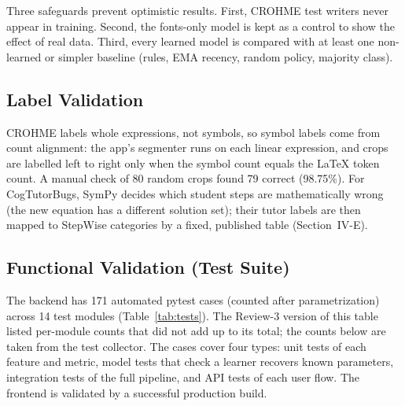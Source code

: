 \documentclass[conference]{IEEEtran}
\begin{document}
Three safeguards prevent optimistic results. First, CROHME test writers never appear in training. Second, the fonts-only model is kept as a control to show the effect of real data. Third, every learned model is compared with at least one non-learned or simpler baseline (rules, EMA recency, random policy, majority class).

\subsection{Label Validation}
CROHME labels whole expressions, not symbols, so symbol labels come from count alignment: the app's segmenter runs on each linear expression, and crops are labelled left to right only when the symbol count equals the LaTeX token count. A manual check of 80 random crops found 79 correct (98.75\%). For CogTutorBugs, SymPy decides which student steps are mathematically wrong (the new equation has a different solution set); their tutor labels are then mapped to StepWise categories by a fixed, published table (Section~IV-E).

\subsection{Functional Validation (Test Suite)}
The backend has 171 automated pytest cases (counted after parametrization) across 14 test modules (Table~\ref{tab:tests}). The Review-3 version of this table listed per-module counts that did not add up to its total; the counts below are taken from the test collector. The cases cover four types: unit tests of each feature and metric, model tests that check a learner recovers known parameters, integration tests of the full pipeline, and API tests of each user flow. The frontend is validated by a successful production build.
\end{document}
